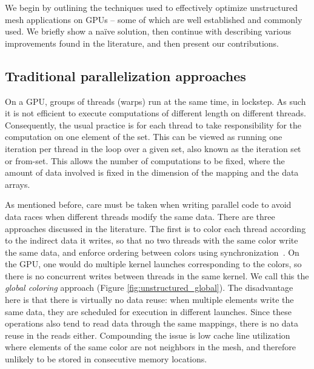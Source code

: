 \noindent We begin by outlining the techniques used to effectively optimize 
unstructured mesh applications on GPUs -- some of which are well established 
and commonly used. We briefly show a na\"{i}ve solution, then continue 
with describing various improvements found in the literature, and then present 
our contributions.

\subsection{Traditional parallelization approaches}

\noindent On a GPU, groups of threads (warps) run at the same time, in 
lockstep. As such it is not efficient to execute computations of different 
length on different threads. Consequently, the usual practice is for each thread 
to take responsibility for the computation on one element of the set. This can 
be viewed as running one iteration per thread in the loop over a given set, also 
known as the iteration set or from-set. This allows the number of computations 
to be fixed, where the amount of data involved is fixed in the dimension of the 
mapping and the data arrays.

As mentioned before, care must be taken when writing parallel code to avoid 
data races when different threads modify the same data. There are three 
approaches discussed in the literature. The first is to color each thread 
according to the indirect data it writes, so that no two threads with the same 
color write the same data, and enforce ordering between colors using 
synchronization~\cite{Zegard2013}. On the GPU, one would do multiple kernel 
launches corresponding to the colors, so there is no concurrent writes between 
threads in the same kernel. We call this the \emph{global coloring} approach 
(Figure \ref{fig:unstructured_global}). The disadvantage here is that there is 
virtually no data reuse: when multiple elements write the same data, they are scheduled 
for execution in different launches. Since these operations also tend to read 
data through the same mappings, there is no data reuse in the reads either. 
Compounding the issue is low cache line utilization where elements of the same 
color are not neighbors in the mesh, and therefore unlikely to be stored in 
consecutive memory locations.

